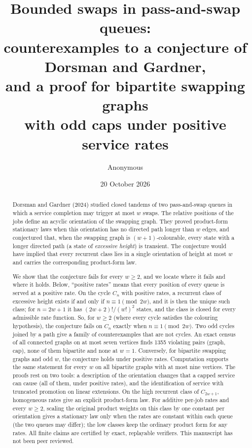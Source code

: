 \documentclass[11pt,a4paper]{article}
\title{Bounded swaps in pass-and-swap queues:\\
counterexamples to a conjecture of Dorsman and Gardner,\\
and a proof for bipartite swapping graphs\\ with odd caps under positive service rates}
\author{Anonymous}
\date{20 October 2026}
\theoremstyle{plain}
\theoremstyle{plain}
\begin{document}
\maketitle

\begin{abstract}
Dorsman and Gardner (2024) studied closed tandems of two pass-and-swap queues in which a service completion may trigger at most $w$ swaps. The relative positions of the jobs define an acyclic orientation of the swapping graph. They proved product-form stationary laws when this orientation has no directed path longer than $w$ edges, and conjectured that, when the swapping graph is $(w+1)$-colourable, every state with a longer directed path (a state of \emph{excessive height}) is transient. The conjecture would have implied that every recurrent class lies in a single orientation of height at most $w$ and carries the corresponding product-form law.

We show that the conjecture fails for every $w\ge2$, and we locate where it fails and where it holds. Below, ``positive rates'' means that every position of every queue is served at a positive rate. On the cycle $C_n$ with positive rates, a recurrent class of excessive height exists if and only if $n\equiv1\pmod{2w}$, and it is then the unique such class; for $n=2w+1$ it has $(2w+2)!/(w!)^2$ states, and the class is closed for every admissible rate function. So, for $w\ge2$ (where every cycle satisfies the colouring hypothesis), the conjecture fails on $C_n$ exactly when $n\equiv1\pmod{2w}$. Two odd cycles joined by a path give a family of counterexamples that are not cycles. An exact census of all connected graphs on at most seven vertices finds 1355 violating pairs (graph, cap), none of them bipartite and none at $w=1$. Conversely, for bipartite swapping graphs and odd $w$, the conjecture holds under positive rates. Computation supports the same statement for every $w$ on all bipartite graphs with at most nine vertices. The proofs rest on two tools: a description of the orientation changes that a capped service can cause (all of them, under positive rates), and the identification of service with truncated promotion on linear extensions. On the high recurrent class of $C_{2w+1}$, homogeneous rates give an explicit product-form law. For additive per-job rates and every $w\ge2$, scaling the original product weights on this class by one constant per orientation gives a stationary law only when the rates are constant within each queue (the two queues may differ); the low classes keep the ordinary product form for any rates. All finite claims are certified by exact, replayable verifiers. This manuscript has not been peer reviewed.
\end{abstract}
\end{document}

